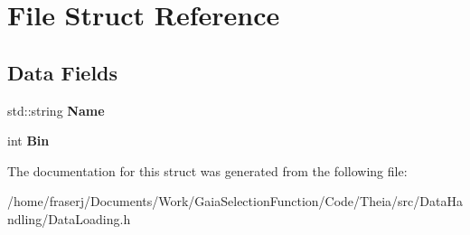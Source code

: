\hypertarget{structFile}{}\section{File Struct Reference}
\label{structFile}
\subsection*{Data Fields}
\begin{DoxyCompactItemize}
\item 
\mbox{\label{structFile_afcb65fdfafd4c6373b4c9d3e1ca9459d}} 
std\+::string {\bfseries Name}
\item 
\mbox{\label{structFile_aced9c357d2c770816f23676e0a059d88}} 
int {\bfseries Bin}
\end{DoxyCompactItemize}


The documentation for this struct was generated from the following file\+:\begin{DoxyCompactItemize}
\item 
/home/fraserj/\+Documents/\+Work/\+Gaia\+Selection\+Function/\+Code/\+Theia/src/\+Data\+Handling/Data\+Loading.\+h\end{DoxyCompactItemize}
